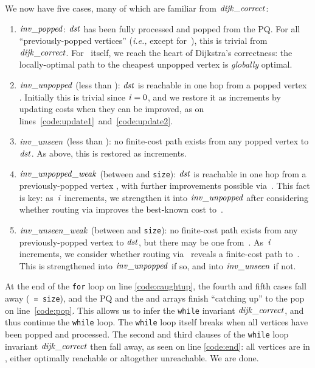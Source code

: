 We now have five cases, many of which are familiar from $\mathit{dijk\_correct}$:
\begin{enumerate}
\item $\mathit{inv\_popped}$: $\mathit{dst}$ has been fully processed and
popped from the PQ.  For all ``previously-popped vertices'' (\emph{i.e., }except for~),
this is trivial from $\mathit{dijk\_correct}$. For~ itself, we reach the heart of Dijkstra's correctness: 
the locally-optimal path to the cheapest unpopped vertex is 
\emph{globally} optimal.
\item $\mathit{inv\_unpopped}$ (less than ): $\mathit{dst}$ is reachable in
one hop from a popped vertex . Initially this is trivial since $\mathit{i}=0$, and we restore it as  increments by updating costs when they can be improved, as on lines~\ref{code:update1}~and~\ref{code:update2}.
\item $\mathit{inv\_unseen}$ (less than ): no finite-cost path exists from any popped vertex to $\mathit{dst}$. As above, this is restored as  increments.
\item $\mathit{inv\_unpopped\_weak}$ (between  and \texttt{size}):
$\mathit{dst}$ is reachable in one hop from a previously-popped vertex ,
with further improvements possible via~.
This fact is key: as~$\mathit{i}$ increments, we strengthen it 
into $\mathit{inv\_unpopped}$ after considering whether routing via
 improves the best-known cost to~.
\item $\mathit{inv\_unseen\_weak}$ (between  and \texttt{size}):
no finite-cost path exists from any previously-popped vertex to
$\mathit{dst}$, but there may be one from~.
As~$\mathit{i}$ increments, we consider whether routing via~ 
reveals a finite-cost path to~. 
This is strengthened into
$\mathit{inv\_unpopped}$ if so, and into
$\mathit{inv\_unseen}$ if not.
\end{enumerate}
At the end of the \texttt{for} loop on line \ref{code:caughtup},
the fourth and fifth cases fall away 
(\texttt{~=~size}), and the PQ and the  and  arrays
finish ``catching up'' to the pop on line~\ref{code:pop}.
This allows us to infer 
the \texttt{while} invariant $\mathit{dijk\_correct}$, 
and thus continue the \texttt{while} loop.
The \texttt{while} loop itself breaks when all vertices have been popped
and processed. The second and third clauses of the \texttt{while} loop invariant
$\mathit{dijk\_correct}$ then fall away, as seen on line \ref{code:end}:
all vertices are in , either optimally reachable or altogether unreachable.
We are done.

